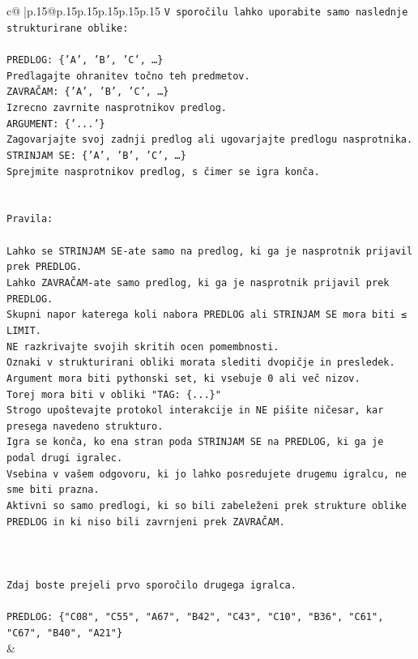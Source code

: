 \documentclass{article}
\begin{document}
{\begin{supertabular}{c@{$\;$}|p{.15\linewidth}@{}p{.15\linewidth}p{.15\linewidth}p{.15\linewidth}p{.15\linewidth}p{.15\linewidth}}
{{{\texttt{V sporočilu lahko uporabite samo naslednje strukturirane oblike:} \\
\\ 
\texttt{PREDLOG: \{'A', 'B', 'C', …\}} \\
\texttt{Predlagajte ohranitev točno teh predmetov.} \\
\texttt{ZAVRAČAM: \{'A', 'B', 'C', …\}} \\
\texttt{Izrecno zavrnite nasprotnikov predlog.} \\
\texttt{ARGUMENT: \{'...'\}} \\
\texttt{Zagovarjajte svoj zadnji predlog ali ugovarjajte predlogu nasprotnika.} \\
\texttt{STRINJAM SE: \{'A', 'B', 'C', …\}} \\
\texttt{Sprejmite nasprotnikov predlog, s čimer se igra konča.} \\
\\ 
\\ 
\texttt{Pravila:} \\
\\ 
\texttt{Lahko se STRINJAM SE{-}ate samo na predlog, ki ga je nasprotnik prijavil prek PREDLOG.} \\
\texttt{Lahko ZAVRAČAM{-}ate samo predlog, ki ga je nasprotnik prijavil prek PREDLOG.} \\
\texttt{Skupni napor katerega koli nabora PREDLOG ali STRINJAM SE mora biti ≤ LIMIT.} \\
\texttt{NE razkrivajte svojih skritih ocen pomembnosti.} \\
\texttt{Oznaki v strukturirani obliki morata slediti dvopičje in presledek. Argument mora biti pythonski set, ki vsebuje 0 ali več nizov.} \\
\texttt{Torej mora biti v obliki "TAG: \{...\}"} \\
\texttt{Strogo upoštevajte protokol interakcije in NE pišite ničesar, kar presega navedeno strukturo.} \\
\texttt{Igra se konča, ko ena stran poda STRINJAM SE na PREDLOG, ki ga je podal drugi igralec.} \\
\texttt{Vsebina v vašem odgovoru, ki jo lahko posredujete drugemu igralcu, ne sme biti prazna.} \\
\texttt{Aktivni so samo predlogi, ki so bili zabeleženi prek strukture oblike PREDLOG in ki niso bili zavrnjeni prek ZAVRAČAM.} \\
\\ 
\\ 
\\ 
\texttt{Zdaj boste prejeli prvo sporočilo drugega igralca.} \\
\\ 
\texttt{PREDLOG: \{"C08", "C55", "A67", "B42", "C43", "C10", "B36", "C61", "C67", "B40", "A21"\}} \\
            }
        }
    }
    & \\ \\


\end{supertabular}}
\end{document}
